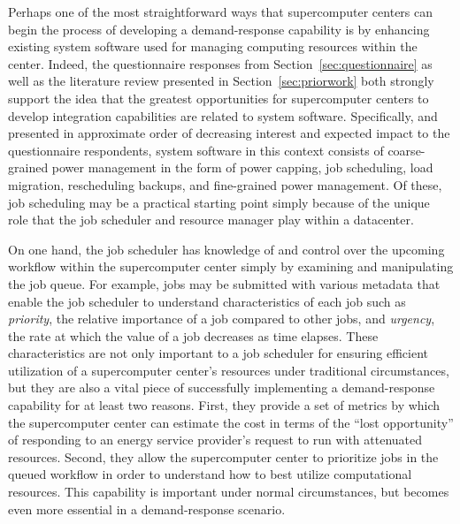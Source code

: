 Perhaps one of the most straightforward ways that supercomputer
centers can begin the process of developing a demand-response
capability is by enhancing existing system software used for managing
computing resources within the center.  Indeed, the questionnaire
responses from Section~\ref{sec:questionnaire} as well as the literature
review presented in Section~\ref{sec:priorwork} both strongly support the
idea that the greatest opportunities for supercomputer centers to
develop integration capabilities are related to system software.
Specifically, and presented in approximate order of decreasing
interest and expected impact to the questionnaire respondents, system
software in this context consists of coarse-grained power management
in the form of power capping, job scheduling, load migration,
rescheduling backups, and fine-grained power management.  Of these,
job scheduling may be a practical starting point simply because of the
unique role that the job scheduler and resource manager play within a
datacenter.


On one hand, the job scheduler has knowledge of and control over the
upcoming workflow within the supercomputer center simply by examining
and manipulating the job queue.  For example, jobs may be submitted
with various metadata that enable the job scheduler to understand
characteristics of each job such as \textit{priority}, the relative
importance of a job compared to other jobs, and \textit{urgency}, the
rate at which the value of a job decreases as time elapses.  These
characteristics are not only important to a job scheduler for ensuring
efficient utilization of a supercomputer center's resources under
traditional circumstances, but they are also a vital piece of
successfully implementing a demand-response capability for at least
two reasons.  First, they provide a set of metrics by which the
supercomputer center can estimate the cost in terms of the ``lost
opportunity'' of responding to an energy service provider's request to
run with attenuated resources.  Second, they allow the supercomputer
center to prioritize jobs in the queued workflow in order to understand
how to best utilize computational resources.  This capability is
important under normal circumstances, but becomes even more essential
in a demand-response scenario.

